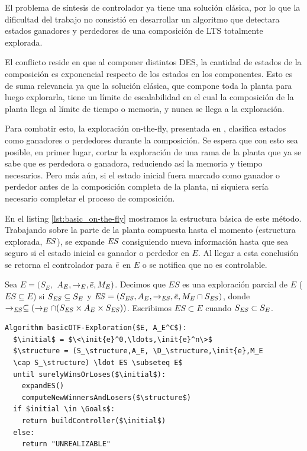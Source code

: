 El problema de síntesis de controlador ya tiene una solución clásica, por lo que la dificultad del trabajo no consistió en desarrollar un algoritmo que detectara estados ganadores y perdedores de una composición de LTS totalmente explorada. 

El conflicto reside en que al componer distintos DES, la cantidad de estados de la composición es exponencial respecto de los estados en los componentes. Esto es de suma relevancia ya que la solución clásica, que compone toda la planta para luego explorarla, tiene un límite de escalabilidad en el cual la composición de la planta llega al límite de tiempo o memoria, y nunca se llega a la exploración.

Para combatir esto, la exploración on-the-fly, presentada en \cite{tesisDani}, clasifica estados como ganadores o perdedores durante la composición. Se espera que con esto sea posible, en primer lugar, cortar la exploración de una rama de la planta que ya se sabe que es perdedora o ganadora, reduciendo así la memoria y tiempo necesarios. Pero más aún, si el estado inicial fuera marcado como ganador o perdedor antes de la composición completa de la planta, ni siquiera sería necesario completar el proceso de composición.

En el listing \ref{lst:basic_on-the-fly} mostramos la estructura básica de este método. Trabajando sobre la parte de la planta compuesta hasta el momento (estructura explorada, $\mathit{ES}$), se expande $\mathit{ES}$ consiguiendo nueva información hasta que sea seguro si el estado inicial es ganador o perdedor en $E$. Al llegar a esta conclusión se retorna el controlador para $\bar{e}$ en $E$ o se notifica que no es controlable.

\begin{definition}
	 \label{def:unexploredTo}
	Sea $E = (S_E,$ $A_E, \rightarrow_E, \bar{e}, M_E)$. Decimos que $ES$ es una exploración parcial de $E$ ($ES \subseteq E$) si $S_{\mathit{ES}} \subseteq 
	S_E$ y $\mathit{ES} = (S_{\mathit{ES}},A_E, \rightarrow_{\mathit{ES}},\bar{e},M_E 
	\cap S_{\mathit{ES}})$, donde $ \rightarrow_{\mathit{ES}} \subseteq (\rightarrow_E \cap 
	(S_{\mathit{ES}} \times A_E \times S_{\mathit{ES}}))$. Escribimos $ES \subset E$ cuando $S_{\mathit{ES}} \subset S_E$.
\end{definition}

\begin{lstlisting}[language={pseudocode},label={lst:basic_on-the-fly},caption={Algoritmo on-the-fly básico},float=ht]
Algorithm basicOTF-Exploration($E, A_E^C$):
  $\initial$ = $\<\init{e}^0,\ldots,\init{e}^n\>$
  $\structure = (S_\structure,A_E, \D_\structure,\init{e},M_E 
  \cap S_\structure) \ldot ES \subseteq E$
  until surelyWinsOrLoses($\initial$):
    expandES()
    computeNewWinnersAndLosers($\structure$)
  if $initial \in \Goals$:
    return buildController($\initial$)
  else:
    return "UNREALIZABLE" 
\end{lstlisting}

